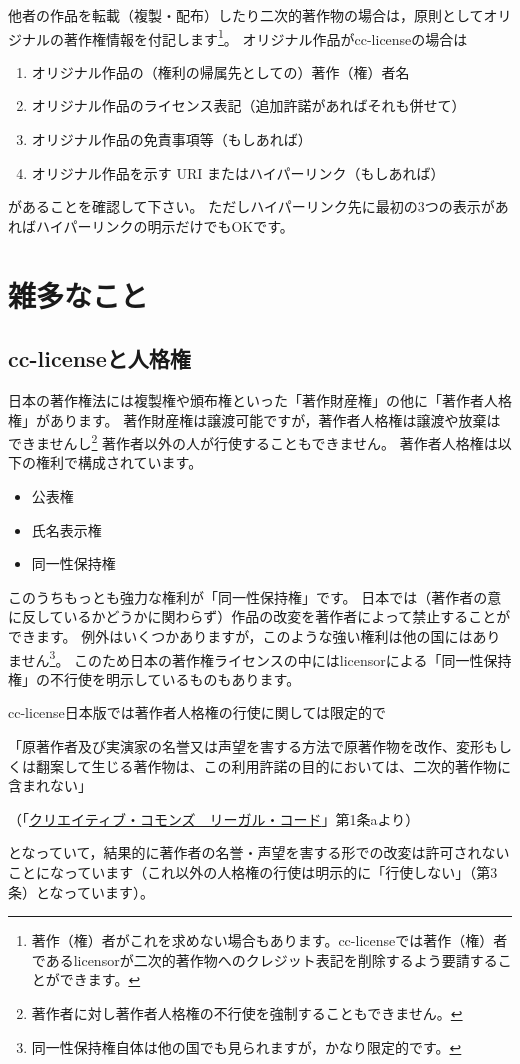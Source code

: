 \documentclass{ltjsarticle}
\begin{document}
他者の作品を転載（複製・配布）したり二次的著作物の場合は，原則としてオリジナルの著作権情報を付記します\footnote{著作（権）者がこれを求めない場合もあります。cc-licenseでは著作（権）者であるlicensorが二次的著作物へのクレジット表記を削除するよう要請することができます。}。
オリジナル作品がcc-licenseの場合は
\begin{enumerate}
\item オリジナル作品の（権利の帰属先としての）著作（権）者名
\item オリジナル作品のライセンス表記（追加許諾があればそれも併せて）
\item オリジナル作品の免責事項等（もしあれば）
\item オリジナル作品を示す URI またはハイパーリンク（もしあれば）
\end{enumerate}
があることを確認して下さい。
ただしハイパーリンク先に最初の3つの表示があればハイパーリンクの明示だけでもOKです。


\section{雑多なこと}

\subsection{cc-licenseと人格権}

日本の著作権法には複製権や頒布権といった「著作財産権」の他に「著作者人格権」があります。
著作財産権は譲渡可能ですが，著作者人格権は譲渡や放棄はできませんし\footnote{著作者に対し著作者人格権の不行使を強制することもできません。} 著作者以外の人が行使することもできません。
著作者人格権は以下の権利で構成されています。
\begin{itemize}
\item 公表権
\item 氏名表示権
\item 同一性保持権
\end{itemize}
このうちもっとも強力な権利が「同一性保持権」です。
日本では（著作者の意に反しているかどうかに関わらず）作品の改変を著作者によって禁止することができます。
例外はいくつかありますが，このような強い権利は他の国にはありません\footnote{同一性保持権自体は他の国でも見られますが，かなり限定的です。}。
このため日本の著作権ライセンスの中にはlicensorによる「同一性保持権」の不行使を明示しているものもあります。

cc-license日本版では著作者人格権の行使に関しては限定的で
\begin{mdframed}
「原著作者及び実演家の名誉又は声望を害する方法で原著作物を改作、変形もしくは翻案して生じる著作物は、この利用許諾の目的においては、二次的著作物に含まれない」\par
（「\href{http://creativecommons.org/licenses/by-sa/2.1/jp/legalcode}{クリエイティブ・コモンズ　リーガル・コード}」第1条aより）
\end{mdframed}
となっていて，結果的に著作者の名誉・声望を害する形での改変は許可されないことになっています（これ以外の人格権の行使は明示的に「行使しない」（第3条）となっています）。
\end{document}
